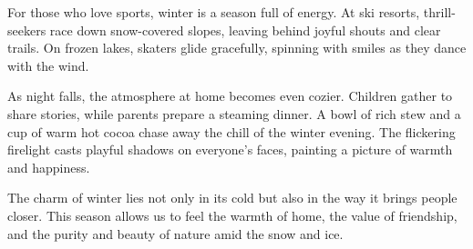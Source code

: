 \documentclass{ctexart}
\begin{document}
For those who love sports, winter is a season full of energy. At ski resorts, thrill-seekers race down snow-covered slopes, leaving behind joyful shouts and clear trails. On frozen lakes, skaters glide gracefully, spinning with smiles as they dance with the wind.

As night falls, the atmosphere at home becomes even cozier. Children gather to share stories, while parents prepare a steaming dinner. A bowl of rich stew and a cup of warm hot cocoa chase away the chill of the winter evening. The flickering firelight casts playful shadows on everyone’s faces, painting a picture of warmth and happiness.

The charm of winter lies not only in its cold but also in the way it brings people closer. This season allows us to feel the warmth of home, the value of friendship, and the purity and beauty of nature amid the snow and ice.
\end{document}
